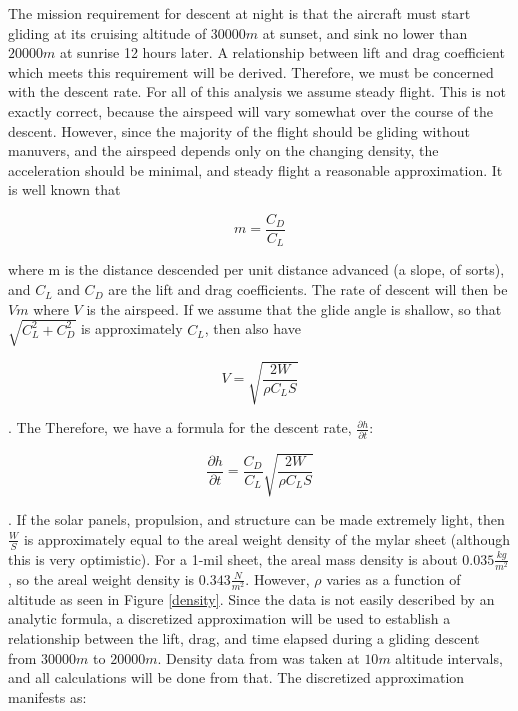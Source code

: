 \documentclass[12pt]{report} %
\begin{document}
The mission requirement for descent at night is that the aircraft must start gliding at its cruising altitude of $30000m$ at sunset,
and sink no lower than $20000m$ at sunrise 12 hours later. A relationship between lift and drag coefficient which meets this requirement
will be derived. Therefore, we must be concerned with the descent rate. For all of this analysis we assume steady flight. This is not
exactly correct, because the airspeed will vary somewhat over the course of the descent. However, since the majority of the flight
should be gliding without manuvers, and the airspeed depends only on the changing density, the acceleration should be minimal,
and steady flight a
reasonable approximation. It is well known that

\[m = \frac{C_D}{C_L}\]

where m is the distance descended per unit distance advanced (a slope, of sorts), and $C_L$ and $C_D$ are the lift and drag coefficients.
The rate of descent will then be $Vm$ where $V$ is the airspeed. If we assume that the glide angle is shallow, so that $\sqrt{C_L^2+C_D^2}$
is approximately $C_L$, then also have

\[V = \sqrt{\frac{2W}{\rho C_L S}}\]

. The Therefore, we have a formula for the descent rate, $\frac{\partial{h}}{\partial{t}}$:

\[\frac{\partial{h}}{\partial{t}} = \frac{C_D}{C_L}\sqrt{\frac{2W}{\rho C_L S}}\]

. If the solar panels, propulsion, and structure can be made extremely light, then $\frac{W}{S}$ is approximately equal to the areal
weight density of the mylar sheet (although this is very optimistic). For a 1-mil sheet, the areal mass density is about $0.035 \frac{kg}{m^2}$,
so the areal weight density is $0.343 \frac{N}{m^2}$.
However, $\rho$ varies as a function of altitude as seen in Figure
\ref{density}. Since the data is not easily described by an analytic
formula, a discretized approximation will be used to establish a relationship between the lift, drag, and time elapsed during a gliding
descent from $30000m$ to $20000m$. Density data from \cite{standardAtmosphere} was taken at $10m$ altitude intervals, and all calculations will
be done from that. The discretized approximation manifests as:
\end{document}
